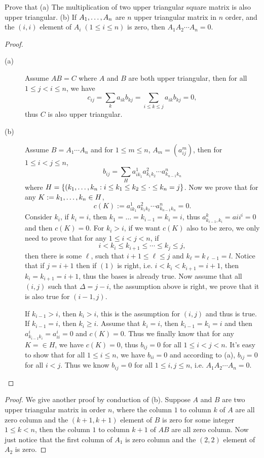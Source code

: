 \begin{pro}%
	Prove that (a) The multiplication of two upper triangular square matrix is also upper triangular. (b) If $A_1,\ldots,A_n$ are $n$ upper triangular matrix in $n$ order, and the $(i,i)$ element of $A_i\;(1\leq i\leq n)$ is zero, then $A_1A_2\cdots A_n=0$.
\end{pro}
\begin{proof}
	\begin{description}
		\item[(a)] Assume $AB=C$ where $A$ and $B$ are both upper triangular, then for all $1\leq j<i\leq n$, we have 
		\[c_{ij}=\sum_k a_{ik}b_{kj}=\sum_{i\leq k\leq j} a_{ik}b_{kj}=0,\]
		thus $C$ is also upper triangular. \\
		\item[(b)] Assume $B=A_1\cdots A_n$ and for $1\leq m\leq n$, $A_m=(a_{ij}^m)$, then for $1\leq i<j\leq n$,
		\[b_{ij}=\sum_H a_{ik_1}^1 a_{k_1k_2}^2\cdots a_{k_{n-1}k_n}^n\]
		where $H=\{(k_1,\ldots,k_n:i\leq k_1\leq k_2\leq\cdot\leq k_n=j\}$. Now we prove that for any $K:=k_1,\ldots,k_n\in H$, 
		\[c(K):=a_{ik_1}^1 a_{k_1k_2}^2\cdots a_{k_{n-1}k_n}^n=0.\]
		Consider $k_{i}$, if $k_i=i$, then $k_1=\ldots=k_{i-1}=k_i=i$, thus $a_{k_{i-1},k_{i}}^k=a{ii}^i=0$ and then $c(K)=0$. For $k_i>i$, if we want $c(K)$ also to be zero, we only need to prove that for any $1\leq i<j<n$, if
		\[i<k_i\leq k_{i+1}\leq \cdots\leq k_j\leq j,\tag{1}\]
		then there is some $\ell$, such that $i+1\leq \ell\leq j$ and $k_{\ell}=k_{\ell-1}=l$.
		Notice that if $j=i+1$ then if $(1)$ is right, i.e. $i<k_i<k_{i+1}=i+1$, then $k_i=k_{i+1}=i+1$, thus the bases is already true. Now assume that all $(i,j)$ such that $\Delta=j-i$, the assumption above is right, we prove that it is also true for $(i-1,j)$.

		If $k_{i-1}>i$, then $k_i>i$, this is the assumption for $(i,j)$ and thus is true. If $k_{i-1}=i$, then $k_i\geq i$. Assume that $k_i=i$, then $k_{i-1}=k_i=i$ and then $a_{k_{i-1}k_i}^i=a_{ii}^i=0$ and $c(K)=0$. Thus we finally know that for any $K=\in H$, we have $c(K)=0$, thus $b_{ij}=0$ for all $1\leq i<j<n$. It's easy to show that for all $1\leq i\leq n$, we have $b_{ii}=0$ and according to (a), $b_{ij}=0$ for all $i<j$. Thus we know $b_{ij}=0$ for all $1\leq i,j\leq n$, i.e. $A_1A_2\cdots A_n=0$.
	\end{description}
\end{proof}

\begin{proof}
	We give another proof by conduction of (b). Suppose $A$ and $B$ are two upper triangular matrix in order $n$, where the column $1$ to column $k$ of $A$ are all zero column and the $(k+1,k+1)$ element of $B$ is zero for some integer $1\leq k<n$, then the column $1$ to column $k+1$ of $AB$ are all zero column. Now just notice that the first column of $A_1$ is zero column and the $(2,2)$ element of $A_2$ is zero.
\end{proof}

